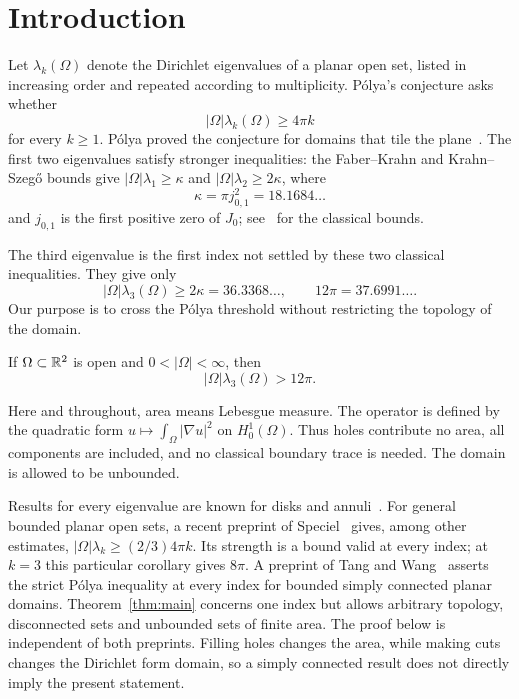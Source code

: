 \section{Introduction}
Let $\lambda_k(\Omega)$ denote the Dirichlet eigenvalues of a planar open set, listed in increasing order and repeated according to multiplicity. P\'olya's conjecture asks whether
\begin{equation}\label{eq:polya}
 |\Omega|\lambda_k(\Omega)\ge 4\pi k
\end{equation}
for every $k\ge1$. P\'olya proved the conjecture for domains that tile the plane~\cite{Polya}. The first two eigenvalues satisfy stronger inequalities: the Faber--Krahn and Krahn--Szeg\H{o} bounds give $|\Omega|\lambda_1\ge\kappa$ and $|\Omega|\lambda_2\ge2\kappa$, where
\[
 \kappa=\pi j_{0,1}^2=18.1684\ldots
\]
and $j_{0,1}$ is the first positive zero of $J_0$; see~\cite{Henrot} for the classical bounds.

The third eigenvalue is the first index not settled by these two classical inequalities. They give only
\[
 |\Omega|\lambda_3(\Omega)\ge2\kappa=36.3368\ldots,
 \qquad 12\pi=37.6991\ldots.
\]
Our purpose is to cross the P\'olya threshold without restricting the topology of the domain.
\begin{theorem}\label{thm:main}
If $\Omega\subset\mathbb R^2$ is open and $0<|\Omega|<\infty$, then
\[
 |\Omega|\lambda_3(\Omega)>12\pi.
\]
\end{theorem}
Here and throughout, area means Lebesgue measure. The operator is defined by the quadratic form $u\mapsto\int_\Omega|\nabla u|^2$ on $H^1_0(\Omega)$. Thus holes contribute no area, all components are included, and no classical boundary trace is needed. The domain is allowed to be unbounded.

Results for every eigenvalue are known for disks and annuli~\cite{Balls,Annuli}. For general bounded planar open sets, a recent preprint of Speciel~\cite{Speciel} gives, among other estimates, $|\Omega|\lambda_k\ge(2/3)4\pi k$. Its strength is a bound valid at every index; at $k=3$ this particular corollary gives $8\pi$.
A preprint of Tang and Wang~\cite{TangWang} asserts the strict P\'olya inequality at every index for bounded simply connected planar domains. Theorem~\ref{thm:main} concerns one index but allows arbitrary topology, disconnected sets and unbounded sets of finite area. The proof below is independent of both preprints. Filling holes changes the area, while making cuts changes the Dirichlet form domain, so a simply connected result does not directly imply the present statement.

